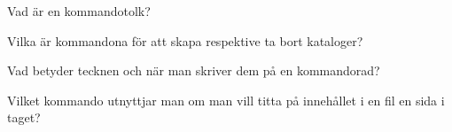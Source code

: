 \item Vad är en kommandotolk?
\qskip
\item Vilka är kommandona för att skapa respektive ta bort kataloger?
\qskip
\item Vad betyder tecknen  och \code{*} när man skriver dem på en kommandorad?
\qskip
\item Vilket kommando utnyttjar man om man vill titta på innehållet i en fil en sida i taget?
